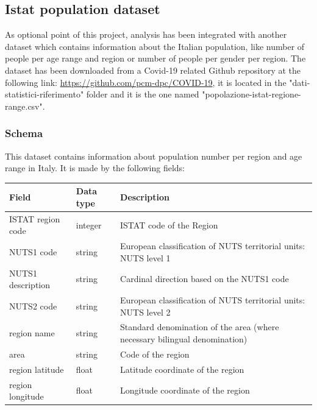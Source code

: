 \documentclass{article}
\begin{document}

\newpage
\subsection{Istat population dataset}
As optional point of this project, analysis has been integrated with another dataset which contains information about the Italian population, like number of people per age range and region or number of people per gender per region. The dataset has been downloaded from a Covid-19 related Github repository at the following link: \url{https://github.com/pcm-dpc/COVID-19}, it is located in the {\selectfont"dati-statistici-riferimento"} folder and it is the one named {\selectfont"popolazione-istat-regione-range.csv"}.

\subsubsection{Schema}
This dataset contains information about population number per region and age range in Italy. It is made by the following fields:
\hfill\break
\begin{center}
\begin{tabular}{ |m{4cm}|m{2cm}|m{4.5cm}|}
  \hline
  \bfseries{Field} & \bfseries{Data type} & \bfseries{Description} \\
  \hline\hline
  ISTAT region code & integer & ISTAT code of the Region\\
  \hline
  NUTS1 code & string & European classification of NUTS territorial units: NUTS level 1\\
    \hline
      NUTS1 description & string & Cardinal direction based on the NUTS1 code\\
    \hline
          NUTS2 code & string & European classification of NUTS territorial units: NUTS level 2\\
              \hline
                        region name & string & Standard denomination of the area (where necessary bilingual denomination)\\
                        \hline
          area & string & Code of the region\\
                        \hline
          region latitude & float & Latitude coordinate of the region\\
                        \hline
          region longitude & float & Longitude coordinate of the region\\
    \hline
    
\end{tabular}
\end{center}
\end{document}
